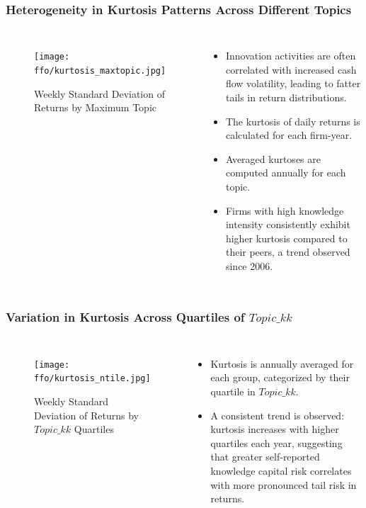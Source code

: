 \documentclass{beamer}
\newcommand{\ffo}{dicfullmc10thr10defnob40noa1_4t}
\begin{document}
\begin{frame}
\frametitle{Heterogeneity in Kurtosis Patterns Across Different Topics}
\scriptsize 
\begin{columns}
\begin{figure}[h!]
\centering
\texttt{[image: \\ffo/kurtosis\_maxtopic.jpg]}
\caption{Weekly Standard Deviation of Returns by Maximum Topic}
\label{fig:kurtosis_maxtopic}
\end{figure}

\scriptsize 
\begin{itemize}
	\item Innovation activities are often correlated with increased cash flow volatility, leading to fatter tails in return distributions.
	\item The kurtosis of daily returns is calculated for each firm-year.
	\item Averaged kurtoses are computed annually for each topic.
	\item Firms with high knowledge intensity consistently exhibit higher kurtosis compared to their peers, a trend observed since 2006.
\end{itemize}
\end{columns}
\end{frame}

\begin{frame}
\frametitle{Variation in Kurtosis Across Quartiles of $Topic\_{kk}$}
\scriptsize 
\begin{columns}
\begin{figure}[h!]
\centering
\texttt{[image: \\ffo/kurtosis\_ntile.jpg]}
\caption{Weekly Standard Deviation of Returns by $Topic\_{kk}$ Quartiles}
\label{fig:kurtosis_ntile}
\end{figure}

\scriptsize 
\begin{itemize}
	\item Kurtosis is annually averaged for each group, categorized by their quartile in $Topic\_{kk}$.
	\item A consistent trend is observed: kurtosis increases with higher quartiles each year, suggesting that greater self-reported knowledge capital risk correlates with more pronounced tail risk in returns.
\end{itemize}
\end{columns}
\end{frame}
\end{document}
